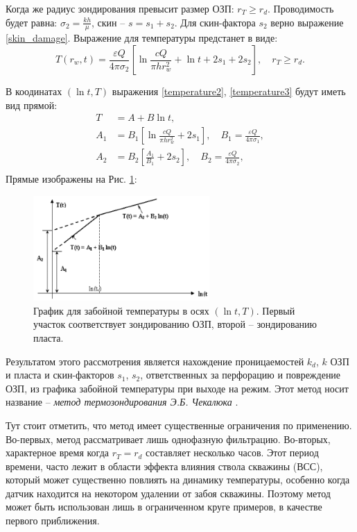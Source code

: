 	Когда же радиус зондирования превысит размер ОЗП: $r_T \geq r_d$.
	Проводимость будет равна: $\sigma_2 = \frac{kh}{\mu}$, скин -- $s = s_1 + s_2$.
	Для скин-фактора $s_2$ верно выражение \eqref{skin_damage}.
	Выражение для температуры предстанет в виде:
\begin{equation}
	\label{temperature3}
	T(r_w, t) = \frac{\varepsilon Q}{4 \pi \sigma_2}\left[\ln\frac{cQ}{\pi h r_w^2}+\ln t + 2s_1 + 2s_2\right],
	\quad r_T \geq r_d.
\end{equation}

	В коодинатах $(\ln{t}, T)$ выражения \eqref{temperature2}, \eqref{temperature3} будут иметь вид прямой:
\begin{align}	
	\label{imperfect_lines}
	T &= A + B\ln t,\\
	A_1 &= B_1\left[\ln\frac{cQ}{\pi h r_w^2} + 2s_1\right], \quad B_1 = \frac{\varepsilon Q}{4\pi\sigma_1},\\
	A_2 &= B_2\left[\frac{A_1}{B_1} + 2s_2\right], \quad B_2 = \frac{\varepsilon Q}{4\pi\sigma_2},\\
\end{align}
	Прямые изображены на Рис. \ref{pic:imperfect_lines}:
\begin{figure}[H]
	\centerline{\includegraphics[width=0.6\textwidth]{pic/imperfect_lines.png}}
	\caption{График для забойной температуры в осях $(\ln t, T)$. Первый участок соответствует зондированию ОЗП, второй -- зондированию пласта.}
	\label{pic:imperfect_lines}
\end{figure}

	Результатом этого рассмотрения является нахождение проницаемостей $k_d$, $k$ ОЗП и пласта и скин-факторов $s_1$, $s_2$, ответственных за перфорацию и повреждение ОЗП, из графика забойной температуры при выходе на режим. Этот метод носит название -- \textit{метод термозондирования Э.Б. Чекалюка} \cite{checkalyuk}.

	Тут стоит отметить, что метод имеет существенные ограничения по применению. Во-первых, метод рассматривает лишь однофазную фильтрацию. Во-вторых, характерное время когда $r_T = r_d$ составляет несколько часов. Этот период времени, часто лежит в области эффекта влияния ствола скважины (ВСС), который может существенно повлиять на динамику температуры, особенно когда датчик находится на некотором удалении от забоя скважины. Поэтому метод может быть использован лишь в ограниченном круге примеров, в качестве первого приближения.
	
